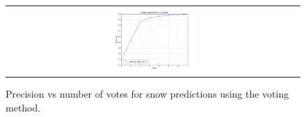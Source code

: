 \begin{figure}
\begin{center}
\begin{tabular}{c}
\includegraphics[width=0.3\textwidth,trim=1cm 0.5cm 1cm 1cm,clip]{plots/precvotes.png}
\end{tabular}
\end{center}
\vspace{-20pt}
\caption{Precision vs number of votes for snow predictions using the voting method.}
\label{fig:precvotes}
\end{figure}






